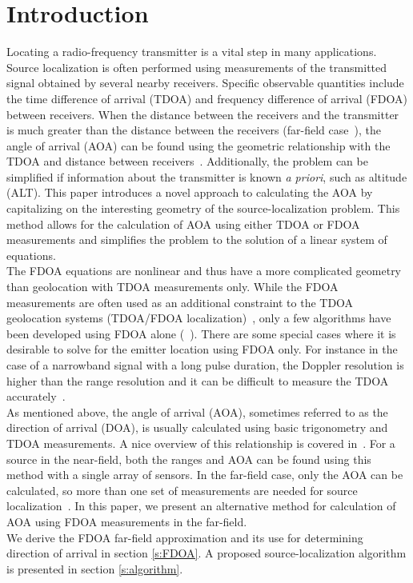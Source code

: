 \section{Introduction}
\label{s:intro}
Locating a radio-frequency transmitter is a vital step in many applications. Source localization is often performed using measurements of the transmitted signal obtained by several nearby receivers. Specific observable quantities include the time difference of arrival (TDOA) and frequency difference of arrival (FDOA) between receivers. When the distance between the receivers and the transmitter is much greater than the distance between the receivers (far-field case~\cite{Cheney2009}), the angle of arrival (AOA) can be found using the geometric relationship with the TDOA and distance between receivers~\cite{Benesty2008}. Additionally, the problem can be simplified if information about the transmitter is known {\em a priori}, such as altitude (ALT). This paper introduces a novel approach to calculating the AOA by capitalizing on the interesting geometry of the source-localization problem. This method allows for the calculation of AOA using either TDOA or FDOA measurements and simplifies the problem to the solution of a linear system of equations. \\

The FDOA equations are nonlinear and thus have a more complicated geometry than geolocation with TDOA measurements only. While the FDOA measurements are often used as an additional constraint to the TDOA geolocation systems (TDOA/FDOA localization)~\cite{Ho1997}, only a few algorithms have been developed using FDOA alone (~\cite{Cameron,Jinzhou2012}). There are some special cases where it is desirable to solve for the emitter location using FDOA only. For instance in the case of a narrowband signal with a long pulse duration, the Doppler resolution is higher than the range resolution and it can be difficult to measure the TDOA accurately~\cite{Cheney2009,Mason2005,Jinzhou2012}. \\

As mentioned above, the angle of arrival (AOA), sometimes referred to as the direction of arrival (DOA), is usually calculated using basic trigonometry and TDOA measurements. A nice overview of this relationship is covered in~\cite{Benesty2008}. For a source in the near-field, both the ranges and AOA can be found using this method with a single array of sensors. In the far-field case, only the AOA can be calculated, so more than one set of measurements are needed for source localization~\cite{Benesty2008}. In this paper, we present an alternative method for calculation of AOA using FDOA measurements in the far-field. \\

We derive the FDOA far-field approximation and its use for determining direction of arrival in section \ref{s:FDOA}. A proposed source-localization algorithm is presented in section \ref{s:algorithm}.
